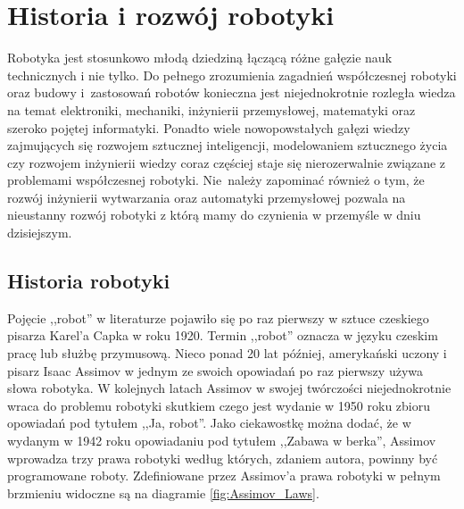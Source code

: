 \chapter{Historia i rozwój robotyki}
\label{ch:history}
Robotyka jest stosunkowo młodą dziedziną łączącą różne gałęzie nauk technicznych
i nie tylko. Do pełnego zrozumienia zagadnień współczesnej robotyki oraz budowy
i~zastosowań robotów konieczna jest niejednokrotnie rozległa wiedza na
temat elektroniki, mechaniki, inżynierii przemysłowej, matematyki oraz szeroko pojętej
informatyki. Ponadto wiele nowopowstałych gałęzi wiedzy zajmujących się rozwojem
sztucznej inteligencji, modelowaniem sztucznego życia czy rozwojem inżynierii
wiedzy coraz częściej staje się nierozerwalnie związane z problemami współczesnej
robotyki. Nie~należy zapominać również o tym, że rozwój inżynierii wytwarzania
oraz automatyki przemysłowej pozwala na nieustanny rozwój robotyki z
którą mamy do czynienia w przemyśle w dniu dzisiejszym.

\section{Historia robotyki}
Pojęcie ,,robot'' w literaturze pojawiło się po raz pierwszy w sztuce czeskiego
pisarza Karel'a Capka w roku 1920. Termin ,,robot'' oznacza w języku czeskim
pracę lub służbę przymusową. Nieco ponad 20 lat później, amerykański uczony i
pisarz Isaac Assimov w jednym ze swoich opowiadań po raz pierwszy używa słowa
robotyka. W kolejnych latach Assimov w swojej twórczości niejednokrotnie wraca do
problemu robotyki skutkiem czego jest wydanie w 1950 roku zbioru opowiadań pod
tytułem ,,Ja, robot''. Jako ciekawostkę można dodać, że w wydanym w 1942 roku
opowiadaniu pod tytułem ,,Zabawa w berka'', Assimov wprowadza trzy prawa
robotyki według których, zdaniem autora, powinny być programowane
roboty\cite{Runaround}. Zdefiniowane przez Assimov'a prawa robotyki w pełnym
brzmieniu widoczne są na diagramie \ref{fig:Assimov_Laws}.

